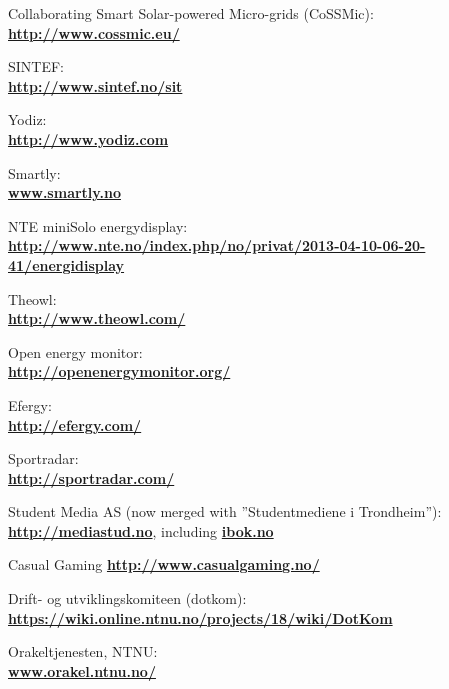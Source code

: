 \begin{thebibliography}{1}

 Collaborating Smart Solar-powered Micro-grids (CoSSMic):\\ \textbf{\url{http://www.cossmic.eu/}}

 SINTEF: \\
\textbf{ \url{ http://www.sintef.no/sit}}

 Yodiz: \\
\textbf{ \url{ http://www.yodiz.com}}
        
 Smartly: \\
\textbf{ \url{www.smartly.no}}

 NTE miniSolo energydisplay:\\
\textbf{ \url{http://www.nte.no/index.php/no/privat/2013-04-10-06-20-41/energidisplay}}

 Theowl:\\
\textbf{ \url{http://www.theowl.com/}}

 Open energy monitor:\\
\textbf{ \url{http://openenergymonitor.org/}}

 Efergy:\\
\textbf{ \url{http://efergy.com/}}

 Sportradar:\\
\textbf{ \url{http://sportradar.com/}}

 Student Media AS (now merged with ''Studentmediene i Trondheim''):\\
\textbf{ \url{http://mediastud.no}}, including \textbf{ \url{ibok.no}}

 Casual Gaming
\textbf{ \url{http://www.casualgaming.no/}}

 Drift- og utviklingskomiteen (dotkom):\\
\textbf{ \url{https://wiki.online.ntnu.no/projects/18/wiki/DotKom}}

 Orakeltjenesten, NTNU:\\
\textbf{ \url{www.orakel.ntnu.no/‎}}


\end{thebibliography}
